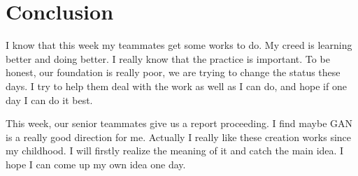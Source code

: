 \documentclass[letterpaper]{article}
\begin{document}
\section{Conclusion}
I know that this week my teammates get some works to do. My creed is learning better and doing better. I really know that the practice is important. To be honest, our foundation is really poor, we are trying to change the status these days. I try to help them deal with the work as well as I can do, and hope if one day I can do it best. 
\par This week, our senior teammates give us a report proceeding. I find maybe GAN is a really good direction for me. Actually I really like these creation works since my childhood. I will firstly realize the meaning of it and catch the main idea. I hope I can come up my own idea one day.
\end{document}
